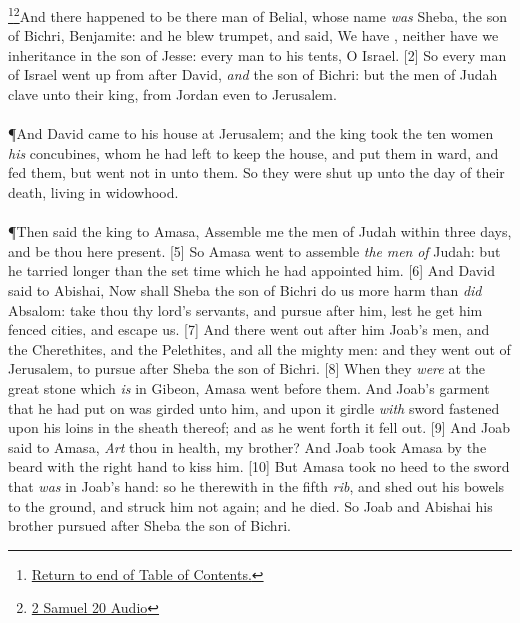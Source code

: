 \footnote{\textcolor[cmyk]{0.99998,1,0,0}{\hyperlink{TOC}{Return to end of Table of Contents.}}}\footnote{\href{https://audiobible.com/bible/2_samuel_20.html}{\textcolor[cmyk]{0.99998,1,0,0}{2 Samuel 20 Audio}}}\textcolor[cmyk]{0.99998,1,0,0}{And there happened to be there  man of Belial, whose name \emph{was} Sheba, the son of Bichri,  Benjamite: and he blew  trumpet, and said, We have , neither have we inheritance in the son of Jesse: every man to his tents, O Israel.}
[2] \textcolor[cmyk]{0.99998,1,0,0}{So every man of Israel went up from after David, \emph{and}  the son of Bichri: but the men of Judah clave unto their king, from Jordan even to Jerusalem.}\\
\\
\P \textcolor[cmyk]{0.99998,1,0,0}{And David came to his house at Jerusalem; and the king took the ten women \emph{his} concubines, whom he had left to keep the house, and put them in ward, and fed them, but went not in unto them. So they were shut up unto the day of their death, living in widowhood.}\\
\\
\P \textcolor[cmyk]{0.99998,1,0,0}{Then said the king to Amasa, Assemble me the men of Judah within three days, and be thou here present.}
[5] \textcolor[cmyk]{0.99998,1,0,0}{So Amasa went to assemble \emph{the} \emph{men} \emph{of} Judah: but he tarried longer than the set time which he had appointed him.}
[6] \textcolor[cmyk]{0.99998,1,0,0}{And David said to Abishai, Now shall Sheba the son of Bichri do us more harm than \emph{did} Absalom: take thou thy lord's servants, and pursue after him, lest he get him fenced cities, and escape us.}
[7] \textcolor[cmyk]{0.99998,1,0,0}{And there went out after him Joab's men, and the Cherethites, and the Pelethites, and all the mighty men: and they went out of Jerusalem, to pursue after Sheba the son of Bichri.}
[8] \textcolor[cmyk]{0.99998,1,0,0}{When they \emph{were} at the great stone which \emph{is} in Gibeon, Amasa went before them. And Joab's garment that he had put on was girded unto him, and upon it  girdle \emph{with}  sword fastened upon his loins in the sheath thereof; and as he went forth it fell out.}
[9] \textcolor[cmyk]{0.99998,1,0,0}{And Joab said to Amasa, \emph{Art} thou in health, my brother? And Joab took Amasa by the beard with the right hand to kiss him.}
[10] \textcolor[cmyk]{0.99998,1,0,0}{But Amasa took no heed to the sword that \emph{was} in Joab's hand: so he  therewith in the fifth \emph{rib}, and shed out his bowels to the ground, and struck him not again; and he died. So Joab and Abishai his brother pursued after Sheba the son of Bichri.}
